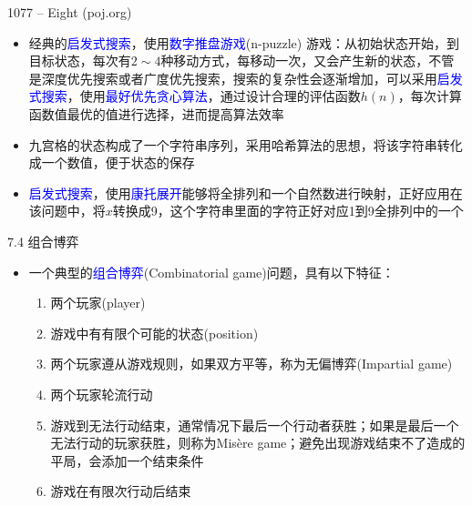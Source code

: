 \begin{frame}{1077 -- Eight (poj.org)}
    \begin{itemize}
        \item 经典的\textcolor{blue}{启发式搜索}，使用\textcolor{blue}{数字推盘游戏}(n-puzzle) 游戏：从初始状态开始，到目标状态，每次有$2\sim4$种移动方式，每移动一次，又会产生新的状态，不管是深度优先搜索或者广度优先搜索，搜索的复杂性会逐渐增加，可以采用\textcolor{blue}{启发式搜索}，使用\textcolor{blue}{最好优先贪心算法}，通过设计合理的评估函数$h(n)$，每次计算函数值最优的值进行选择，进而提高算法效率
        \item 九宫格的状态构成了一个字符串序列，采用哈希算法的思想，将该字符串转化成一个数值，便于状态的保存
        \item \textcolor{blue}{启发式搜索}，使用\textcolor{blue}{康托展开}能够将全排列和一个自然数进行映射，正好应用在该问题中，将$x$转换成9，这个字符串里面的字符正好对应1到9全排列中的一个
    \end{itemize}
\end{frame}
\begin{frame}{7.4 组合博弈}
    \begin{itemize}
        \item 一个典型的\textcolor{blue}{组合博弈}(Combinatorial game)问题，具有以下特征：
        \begin{enumerate}[(1)]
            \item 两个玩家(player)
            \item 游戏中有有限个可能的状态(position)
            \item 两个玩家遵从游戏规则，如果双方平等，称为无偏博弈(Impartial game)
            \item 两个玩家轮流行动
            \item 游戏到无法行动结束，通常情况下最后一个行动者获胜；如果是最后一个无法行动的玩家获胜，则称为Misère game；避免出现游戏结束不了造成的平局，会添加一个结束条件
            \item 游戏在有限次行动后结束
        \end{enumerate}
    \end{itemize}
\end{frame}
